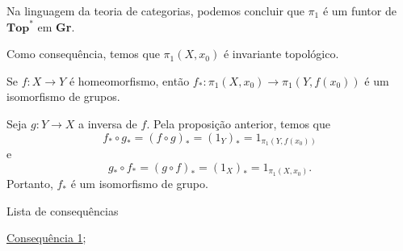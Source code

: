 Na linguagem da teoria de categorias, podemos concluir que $\pi_1$ é um funtor de $\textbf{Top}^*$ em \textbf{Gr}. 

Como consequência, temos que $\pi_1(X,x_0)$ é invariante topológico.

\begin{corol}
    Se $f:X\rightarrow Y$ é homeomorfismo, então $f_*:\pi_1 (X,x_0)\rightarrow \pi_1(Y,f(x_0))$ é um isomorfismo de grupos.
\end{corol}

\begin{dem}
    Seja $g:Y\rightarrow X$ a inversa de $f.$ Pela proposição anterior, temos que 
    $$f_*\circ g_*=(f\circ g)_*=(1_Y)_*=1_{\pi_1(Y,f(x_0))}$$
    e 
    $$g_*\circ f_*=(g\circ f)_*=(1_X)_*=1_{\pi_1 (X,x_0)}.$$
    Portanto, $f_*$ é um isomorfismo de grupo.
\end{dem}

\begin{titlemize}{Lista de consequências}
	\item \hyperref[consequencia1]{Consequência 1};\\ %
	\item \hyperref[]{}
\end{titlemize}
